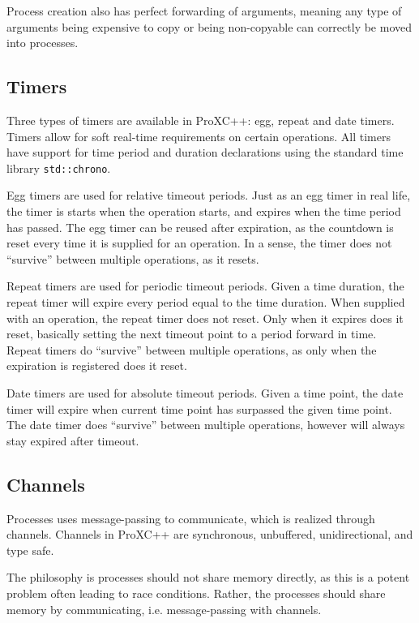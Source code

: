 Process creation also has perfect forwarding of arguments, meaning any type of arguments being expensive to copy or being non\hyp{}copyable can correctly be moved into processes.


\subsection{Timers}

Three types of timers are available in ProXC++: egg, repeat and date timers. Timers allow for soft real\hyp{}time requirements on certain operations. All timers have support for time period and duration declarations using the standard time library \lstinline[style={CustomC++}]|std::chrono|.

Egg timers are used for relative timeout periods. Just as an egg timer in real life, the timer is starts when the operation starts, and expires when the time period has passed. The egg timer can be reused after expiration, as the countdown is reset every time it is supplied for an operation. In a sense, the timer does not ``survive'' between multiple operations, as it resets.

Repeat timers are used for periodic timeout periods. Given a time duration, the repeat timer will expire every period equal to the time duration. When supplied with an operation, the repeat timer does not reset. Only when it expires does it reset, basically setting the next timeout point to a period forward in time. Repeat timers do ``survive'' between multiple operations, as only when the expiration is registered does it reset. 

Date timers are used for absolute timeout periods. Given a time point, the date timer will expire when current time point has surpassed the given time point. The date timer does ``survive'' between multiple operations, however will always stay expired after timeout. 


\subsection{Channels}

Processes uses message\hyp{}passing to communicate, which is realized through channels. Channels in ProXC++ are synchronous, unbuffered, unidirectional, and type safe. 

The philosophy is processes should not share memory directly, as this is a potent problem often leading to race conditions. Rather, the processes should share memory by communicating, i.e. message\hyp{}passing with channels.

